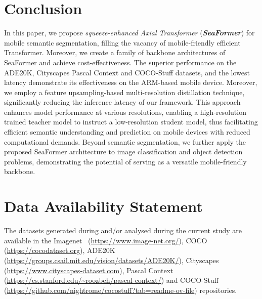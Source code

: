 \section{Conclusion}
\label{con}
In this paper, we propose {\em squeeze-enhanced Axial Transformer} ({\bf{\em SeaFormer}}) for mobile semantic segmentation, filling the vacancy of mobile-friendly efficient Transformer.
Moreover, we create a family of backbone architectures of SeaFormer and achieve cost-effectiveness.
The superior performance on the ADE20K, Cityscapes Pascal Context and COCO-Stuff datasets, and the lowest latency demonstrate its effectiveness on the ARM-based mobile device.
Moreover, we employ a feature upsampling-based multi-resolution distillation technique, significantly reducing the inference latency of our framework. This approach enhances model performance at various resolutions, enabling a high-resolution trained teacher model to instruct a low-resolution student model, thus facilitating efficient semantic understanding and prediction on mobile devices with reduced computational demands.
Beyond semantic segmentation, we further apply the proposed SeaFormer architecture to image classification and object detection problems, demonstrating the potential of serving as a versatile mobile-friendly backbone. 

\section{Data Availability Statement}
The datasets generated during and/or analysed during the current study are available in the Imagenet~\cite{deng2009imagenet} (\url{https://www.image-net.org/}), COCO~\cite{caesar2018coco} (\url{https://cocodataset.org}), ADE20K~\cite{zhou2017scene} (\url{https://groups.csail.mit.edu/vision/datasets/ADE20K/}), Cityscapes~\cite{cordts2016cityscapes} (\url{https://www.cityscapes-dataset.com}), Pascal Context~\cite{mottaghi2014role} (\url{https://cs.stanford.edu/~roozbeh/pascal-context/}) and COCO-Stuff~\cite{caesar2018coco} (\url{https://github.com/nightrome/cocostuff?tab=readme-ov-file}) repositories.